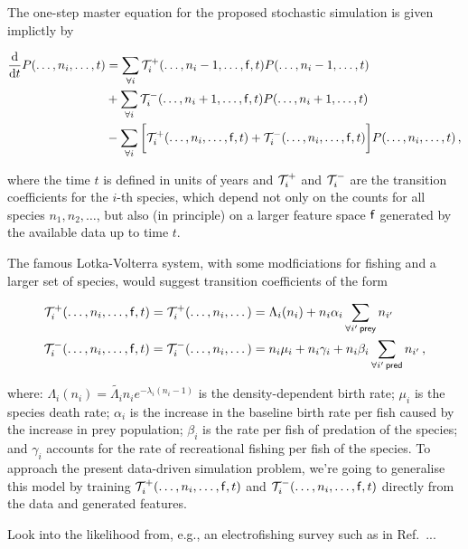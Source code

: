 \documentclass{book}
\begin{document}
The one-step master equation for the proposed stochastic simulation is given implictly by

\begin{align}
\frac{{\rm d}}{{\rm d} t} P(\dots, n_{i}, \dots, t) &= \sum_{\forall i}{\cal T}^{+}_{i}(\dots, n_i-1, \dots, {\sf f}, t)P(\dots, n_{i}-1, \dots, t) \\
&+ \sum_{\forall i}{\cal T}^{-}_{i}(\dots, n_i+1, \dots, {\sf f}, t)P(\dots, n_{i}+1, \dots, t) \\
&- \sum_{\forall i}\bigg[ {\cal T}^{+}_{i}(\dots, n_i, \dots, {\sf f}, t) + {\cal T}^{-}_{i}(\dots, n_i, \dots, {\sf f}, t) \bigg] P(\dots, n_{i}, \dots,t) \,,
\end{align}

where the time $t$ is defined in units of years and ${\cal T}^{+}_{i}$ and ${\cal T}^{-}_{i}$ are the transition coefficients for the $i$-th species, which depend not only on the counts for all species $n_1, n_2, \dots$, but also (in principle) on a larger feature space ${\sf f}$ generated by the available data up to time $t$.

The famous Lotka-Volterra system, with some modficiations for fishing and a larger set of species, would suggest transition coefficients of the form


\begin{align}
{\cal T}^{+}_{i}(\dots, n_i, \dots, {\sf f}, t) = {\cal T}^{+}_{i}(\dots, n_i, \dots) &= \Lambda_{i}(n_{i}) + n_{i}\alpha_{i}\sum_{\forall i' \, {\sf prey}}n_{i'}\\
{\cal T}^{-}_{i}(\dots, n_i, \dots, {\sf f}, t) = {\cal T}^{-}_{i}(\dots, n_i, \dots) &= n_{i}\mu_{i} +  n_{i}\gamma_{i} + n_{i}\beta_{i} \sum_{\forall i' \, {\sf pred}} n_{i'} \,,
\end{align}


where: $\Lambda_{i}(n_{i}) = \tilde{\Lambda_{i}}n_{i}e^{-\lambda_i(n_{i}-1)}$ is the density-dependent birth rate; $\mu_{i}$ is the species death rate; $\alpha_{i}$ is the increase in the baseline birth rate per fish caused by the increase in prey population; $\beta_{i}$ is the rate per fish of predation of the species; and $\gamma_{i}$ accounts for the rate of recreational fishing per fish of the species. To approach the present data-driven simulation problem, we're going to generalise this model by training ${\cal T}^{+}_{i}(\dots, n_i, \dots, {\sf f}, t)$ and ${\cal T}^{-}_{i}(\dots, n_i, \dots, {\sf f}, t)$ directly from the data and generated features.

Look into the likelihood from, e.g., an electrofishing survey such as in Ref.~\cite{envagency2015}...
\end{document}
